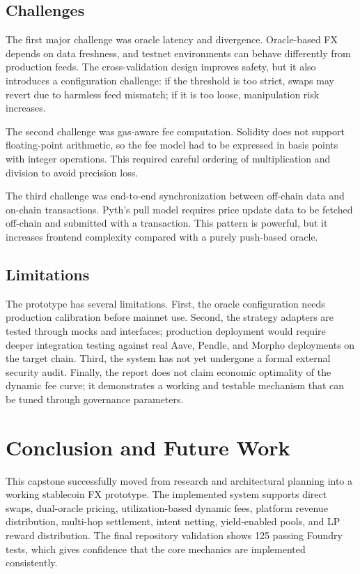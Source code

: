 \documentclass{article}
\begin{document}
\subsection{Challenges}

The first major challenge was oracle latency and divergence. Oracle-based FX depends on data freshness, and testnet environments can behave differently from production feeds. The cross-validation design improves safety, but it also introduces a configuration challenge: if the threshold is too strict, swaps may revert due to harmless feed mismatch; if it is too loose, manipulation risk increases.

The second challenge was gas-aware fee computation. Solidity does not support floating-point arithmetic, so the fee model had to be expressed in basis points with integer operations. This required careful ordering of multiplication and division to avoid precision loss.

The third challenge was end-to-end synchronization between off-chain data and on-chain transactions. Pyth's pull model requires price update data to be fetched off-chain and submitted with a transaction. This pattern is powerful, but it increases frontend complexity compared with a purely push-based oracle.

\subsection{Limitations}

The prototype has several limitations. First, the oracle configuration needs production calibration before mainnet use. Second, the strategy adapters are tested through mocks and interfaces; production deployment would require deeper integration testing against real Aave, Pendle, and Morpho deployments on the target chain. Third, the system has not yet undergone a formal external security audit. Finally, the report does not claim economic optimality of the dynamic fee curve; it demonstrates a working and testable mechanism that can be tuned through governance parameters.

\section{Conclusion and Future Work}

This capstone successfully moved from research and architectural planning into a working stablecoin FX prototype. The implemented system supports direct swaps, dual-oracle pricing, utilization-based dynamic fees, platform revenue distribution, multi-hop settlement, intent netting, yield-enabled pools, and LP reward distribution. The final repository validation shows 125 passing Foundry tests, which gives confidence that the core mechanics are implemented consistently.
\end{document}
